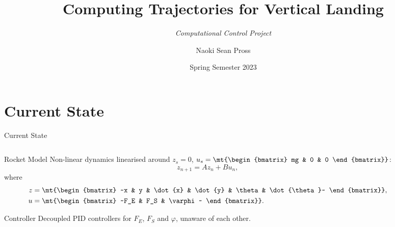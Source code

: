 \documentclass[xetex, smaller, aspectratio=43]{beamer}
\title{Computing Trajectories for Vertical Landing}
\subtitle{\slshape Computational Control Project}
\author{Naoki Sean Pross}
\date{Spring Semester 2023}
\institute[ETHZ]{ETH Zürich}
\begin{document}

\section{Current State}

\begin{frame}[fragile]{Current State}
  \begin{columns}
    \begin{column}[b]{.5\linewidth}
      \begin{block}{Rocket Model}
        Non-linear dynamics linearised around $z_s = 0$,
        $u_s = \mt{\begin{bmatrix} mg & 0 & 0 \end{bmatrix}}$:
        \[
          z_{n+1} = A z_n + B u_n,
        \]
        where
        \begin{align*}
          z &= \mt{\begin{bmatrix}
            ~x & y & \dot{x} & \dot{y} & \theta & \dot{\theta}~
          \end{bmatrix}}, \\
          u &= \mt{\begin{bmatrix}
            ~F_E & F_S & \varphi~
          \end{bmatrix}}.
        \end{align*}
      \end{block}
      \begin{block}{Controller}
        Decoupled PID controllers for $F_E$, $F_S$ and $\varphi$,
        unaware of each other.
      \end{block}
    \end{column}
    \begin{column}[b]{.5\linewidth}
      \begin{center}
\end{center}
\end{column}
\end{columns}
\end{frame}
\end{document}
